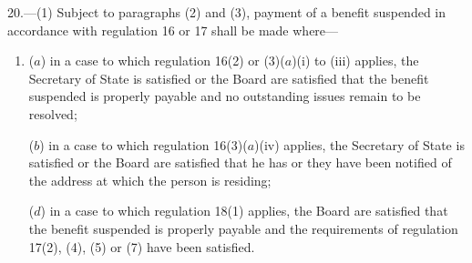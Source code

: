 \documentclass[12pt,a4paper]{article}
\begin{document}
20.—(1) Subject to paragraphs (2) and (3), payment of a benefit suspended in accordance with regulation 16 
or 17  %
shall be made where—
\begin{enumerate}\item[]
($a$) in a case to which regulation 16(2) or (3)($a$)(i) to (iii) applies, the Secretary of State is satisfied 
or the Board are satisfied  %
that the benefit suspended is properly payable and no outstanding issues remain to be resolved;

($b$) in a case to which regulation 16(3)($a$)(iv) applies, the Secretary of State is satisfied 
or the Board are satisfied  %
that he has 
or they have  %
been notified of the address at which the person is residing;



($d$) in a case to which regulation 18(1) applies, the Board are satisfied that the benefit suspended is properly payable and the requirements of regulation 17(2), (4), (5) or (7) have been satisfied.
\end{enumerate}

%
\end{document}
